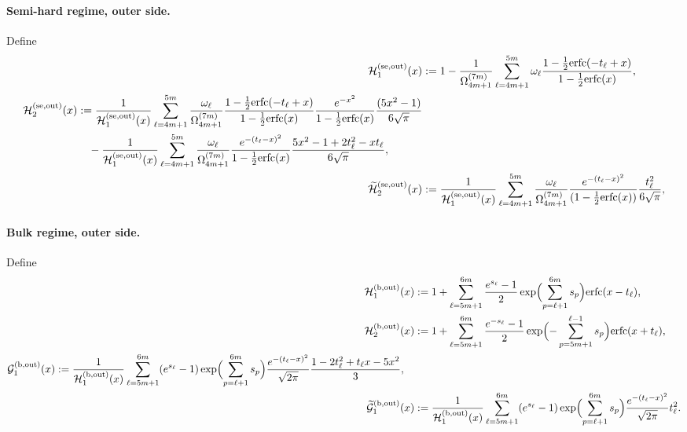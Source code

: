 \documentclass[a4paper]{article}
\newcommand{\erfc}{{\rm erfc}}
\numberwithin{equation}{section}
\begin{document}
\paragraph{Semi-hard regime, outer side.}
Define
\begin{align}
\mathcal{H}_{1}^{(\mathrm{se,out})}
(x)
&:=
1-\frac{1}{\Omega_{4m+1}^{(7m)}}\sum_{\ell=4m+1}^{5m}\omega_{\ell}
\frac{1-\frac{1}{2}\erfc(-t_{\ell}+x)}{1-\frac{1}{2}\erfc(x)}, 
\\
\begin{split}
\mathcal{H}_{2}^{(\mathrm{se,out})}
(x)
&:=
\frac{1}{\mathcal{H}_{1}^{(\mathrm{se,out})}
(x)}
\sum_{\ell=4m+1}^{5m}\frac{\omega_{\ell}}{\Omega_{4m+1}^{(7m)}}
\frac{1-\frac{1}{2}\erfc(-t_{\ell}+x)}{1-\frac{1}{2}\erfc(x)}
\frac{e^{-x^2}}{1-\frac{1}{2}\erfc(x)}
\frac{(5x^2-1)}{6\sqrt{\pi}}
\\
&\quad
-
\frac{1}{\mathcal{H}_{1}^{(\mathrm{se,out})}
(x)}
\sum_{\ell=4m+1}^{5m}\frac{\omega_{\ell}}{\Omega_{4m+1}^{(7m)}}
\frac{e^{-(t_{\ell}-x)^2}}{1-\frac{1}{2}\erfc(x)}
\frac{5x^2-1+2t_{\ell}^2-xt_{\ell}}{6\sqrt{\pi}},
\end{split}
\\
\widetilde{\mathcal{H}}_{2}^{(\mathrm{se,out})}
(x)
&:=
\frac{1}{\mathcal{H}_{1}^{(\mathrm{se,out})}
(x)}
\sum_{\ell=4m+1}^{5m}\frac{\omega_{\ell}}{\Omega_{4m+1}^{(7m)}}
\frac{e^{-(t_{\ell}-x)^2}}{(1-\frac{1}{2}\erfc(x))}
\frac{t_{\ell}^2}{6\sqrt{\pi}}, 
\end{align}
\paragraph{Bulk regime, outer side.}
Define
\begin{align}
\mathcal{H}_1^{(\mathrm{b,out})}(x)
&:=
1+\sum_{\ell=5m+1}^{6m}\frac{e^{s_{\ell}}-1}{2}
\exp\Bigl( 
\sum_{p=\ell+1}^{6m}s_{p}
\Bigr)
\erfc(x-t_{\ell}), 
\\
\mathcal{H}_2^{(\mathrm{b,out})}(x)
&:=
1+\sum_{\ell=5m+1}^{6m}\frac{e^{-s_{\ell}}-1}{2}
\exp\Bigl( 
-\sum_{p=5m+1}^{\ell-1}s_{p}
\Bigr)
\erfc(x+t_{\ell}), 
\\
\begin{split}
\mathcal{G}_1^{(\mathrm{b,out})}(x)
&:=
\frac{1}{\mathcal{H}_1^{(\mathrm{b,out})}(x)}
\sum_{\ell=5m+1}^{6m}
(e^{s_{\ell}}-1)\exp\Bigl( 
\sum_{p=\ell+1}^{6m}s_{p}
\Bigr)
\frac{e^{-(t_{\ell}-x)^2}}{\sqrt{2\pi}}
\frac{1-2t_{\ell}^2+t_{\ell}x-5x^2}{3}, 
\end{split}
\\
\widetilde{\mathcal{G}}_1^{(\mathrm{b,out})}(x)
&:=
\frac{1}{\mathcal{H}_1^{(\mathrm{b,out})}(x)}
\sum_{\ell=5m+1}^{6m}
(e^{s_{\ell}}-1)\exp\Bigl( 
\sum_{p=\ell+1}^{6m}s_{p}
\Bigr)
\frac{e^{-(t_{\ell}-x)^2}}{\sqrt{2\pi}}
t_{\ell}^2. 
\end{align}
\end{document}
